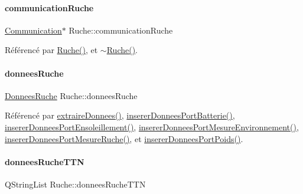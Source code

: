 \mbox{\label{class_ruche_a6211b7b8f43abf5eecf8a1fc2d0f037e}} 
\paragraph{\texorpdfstring{communication\+Ruche}{communicationRuche}}
{\footnotesize\ttfamily \hyperlink{class_communication}{Communication}$\ast$ Ruche\+::communication\+Ruche\hspace{0.3cm}{\ttfamily [private]}}



Référencé par \hyperlink{class_ruche_a8b4ee3752d984c5acee93b990db7939a}{Ruche()}, et \hyperlink{class_ruche_ad3f950d0731f9801f06dd6ae09f2e5fa}{$\sim$\+Ruche()}.

\mbox{\label{class_ruche_a1526bfa78f03e0710ad16f880a40c15f}} 
\paragraph{\texorpdfstring{donnees\+Ruche}{donneesRuche}}
{\footnotesize\ttfamily \hyperlink{struct_donnees_ruche}{Donnees\+Ruche} Ruche\+::donnees\+Ruche\hspace{0.3cm}{\ttfamily [private]}}



Référencé par \hyperlink{class_ruche_a21c0dafeaec03d451590037343e6a3ca}{extraire\+Donnees()}, \hyperlink{class_ruche_a509367d6b2bcb7e6431fc1cc5ff606b5}{inserer\+Donnees\+Port\+Batterie()}, \hyperlink{class_ruche_ad21de5f7d48195be0658f52c55f34183}{inserer\+Donnees\+Port\+Ensoleillement()}, \hyperlink{class_ruche_a46c0f440f40a5125f2d579b481660457}{inserer\+Donnees\+Port\+Mesure\+Environnement()}, \hyperlink{class_ruche_aa61f6dd8b15e5242ef3a3bdd87cca4a3}{inserer\+Donnees\+Port\+Mesure\+Ruche()}, et \hyperlink{class_ruche_a923f42fc4878a01f6102966a748e8f37}{inserer\+Donnees\+Port\+Poids()}.

\mbox{\label{class_ruche_a4556832042641c08a6ef2ab9d80d771e}} 
\paragraph{\texorpdfstring{donnees\+Ruche\+T\+TN}{donneesRucheTTN}}
{\footnotesize\ttfamily Q\+String\+List Ruche\+::donnees\+Ruche\+T\+TN\hspace{0.3cm}{\ttfamily [private]}}



